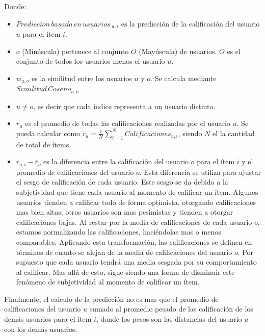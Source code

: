 \documentclass[11pt,a4paper,twoside]{thesis}
\begin{document}
\begin{description}
	\item[Donde:]
\end{description}
\begin{itemize}
	\item $Prediccion \mspace{3mu}basada \mspace{3mu}en \mspace{3mu}usuarios\mspace{3mu}_{u, i}$ es la predicción de la calificación del usuario $u$ para el ítem $i$.
	\item $o$ (Minúscula) pertenece al conjunto $O$ (Mayúscula) de usuarios. $O$ es el conjunto de todos los usuarios menos el usuario $u$.
	\item $w_{u,o}$ es la similitud entre los usuarios $u$ y $o$. Se calcula mediante $Similitud \mspace{3mu}Coseno_{u, o}$
	\item $u \neq o$, es decir que cada índice representa a un usuario distinto.
	\item $\overline{r}_{u}$ es el promedio de todas las calificaciones realizadas
	      por el usuario $u$. Se pueda calcular como $\overline{r}_{u} = \frac{1}{N} \sum_{i=1}^N Calificaciones_{u,i}$, siendo $N$ el la cantidad de total de ítems.
	\item $r_{o,i} - \overline{r}_{o}$ es la diferencia entre la calificación del usuario $o$ para
	      el ítem $i$ y el promedio de calificaciones del usuario $o$. Esta diferencia se utiliza
	      para ajustar el sesgo de calificación de cada usuario. Este sesgo se da debido a la
	      subjetividad que tiene cada usuario al momento de calificar un ítem. Algunos usuarios
	      tienden a calificar todo de forma optimista, otorgando calificaciones mas bien altas;
	      otros usuarios son mas pesimistas y tienden a otorgar  calificaciones bajas. Al restar
	      por la media de calificaciones de cada usuario $o$, estamos normalizando
	      las calificaciones, haciéndolas mas o menos comparables. Aplicando esta transformación,
	      las calificaciones se definen en términos de cuanto se alejan de la media de
	      calificaciones del usuario $o$.
	      Por supuesto que cada usuario tendrá una media sesgada por su comportamiento al calificar. Mas allá
	      de esto, sigue siendo una forma de disminuir este fenómeno de subjetividad al
	      momento de calificar un ítem.
\end{itemize}

Finalmente, el calculo de la predicción no es mas que el promedio de
calificaciones del usuario $u$ sumado al promedio pesado de las calificación de
los demás usuarios para el ítem $i$, donde los pesos son las distancias del
usuario $u$ con los demás usuarios.
\end{document}
